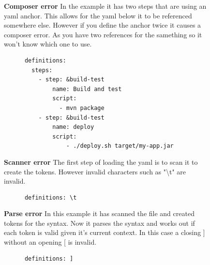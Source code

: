 \documentclass[twoside,12pt,titlepage,a4paper]{article}
\begin{document}
\begin{figure}[!h]
  \centering
  \begin{minipage}[t]{.48\textwidth}
    \textbf{Composer error}
    In the example it has two steps that are using an yaml anchor. This allows for the yaml below it to be referenced somewhere else. However if you define the anchor twice it causes a composer error. As you have two references for the samething so it won't know which one to use.
  \end{minipage}%
  \hfill
  \begin{minipage}[t]{.48\textwidth}
    \begin{verbatim}
      definitions: 
        steps:
          - step: &build-test
              name: Build and test
              script:
                - mvn package
          - step: &build-test
              name: deploy
              script:
                  - ./deploy.sh target/my-app.jar
    \end{verbatim}
  \end{minipage}
\end{figure}

\begin{figure}[!h]
  \centering
  \begin{minipage}[t]{.48\textwidth}
    \textbf{Scanner error}
    The first step of loading the yaml is to scan it to create the tokens. However invalid characters such as "\textbackslash t" are invalid. 
  \end{minipage}%
  \hfill
  \begin{minipage}[t]{.48\textwidth}
    \begin{verbatim}
      definitions: \t
    \end{verbatim}
  \end{minipage}
\end{figure}
\begin{figure}[!ht]
  \centering
  \begin{minipage}[t]{.48\textwidth}
    \textbf{Parse error}
    In this example it has scanned the file and created tokens for the syntax. Now it parses the syntax and works out if each token is valid given it's current context. In this case a closing ] without an opening [ is invalid.
  \end{minipage}%
  \hfill
  \begin{minipage}[t]{.48\textwidth}
    \begin{verbatim}
      definitions: ]
    \end{verbatim}
  \end{minipage}
\end{figure}
\end{document}
